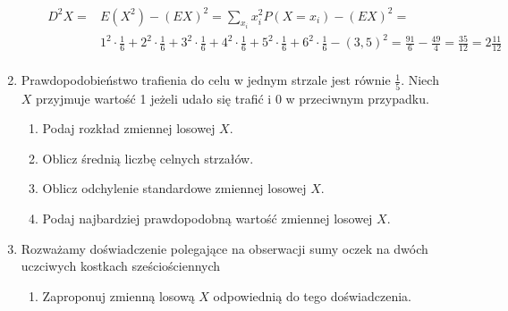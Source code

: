 \documentclass[twoside]{mwart}
\newcommand{\ans}[1]{}
\newcommand{\ans}[1]{\par\emph{Odpowiedź:} #1}
\begin{document}
\begin{enumerate}
\begin{enumerate}
{\begin{enumerate}
\begin{align*}
			D^2X = & E(X^2)-(EX)^2 = \sum_{x_i} x_i^2P(X=x_i) - (EX)^2 = \\
			& 1^2\cdot\frac{1}{6} + 2^2\cdot\frac{1}{6} + 3^2\cdot\frac{1}{6} + 4^2\cdot\frac{1}{6} + 5^2\cdot\frac{1}{6} + 6^2\cdot\frac{1}{6} - (3,5)^2 = \frac{91}{6} - \frac{49}{4} = \frac{35}{12} = 2\frac{11}{12} \\
		\end{align*}
	\end{enumerate}
}
\end{enumerate}
\item Prawdopodobieństwo trafienia do celu w jednym strzale jest równie $\frac{1}{5}$. Niech $X$ przyjmuje wartość 1 jeżeli udało się trafić i 0 w przeciwnym przypadku.
\begin{enumerate}
\item Podaj rozkład zmiennej losowej $X$. \ans{$P(X=1)=p\quad P(X=0)=1-p \qquad p=\frac{1}{5}$}
\item Oblicz średnią liczbę celnych strzałów. \ans{$EX=1\cdot p+0\cdot (1-p)=p=\frac{1}{5}$}
\item Oblicz odchylenie standardowe zmiennej losowej $X$. \ans{$DX= \sqrt{D^2X} = \sqrt{E(X^2)-(EX)^2} = \sqrt{1^2\cdot p - p^2} = \sqrt{p(1-p)}=\sqrt{\frac{4}{25}} = \frac{2}{5}$}
\item Podaj najbardziej prawdopodobną wartość zmiennej losowej $X$. \ans{$0$, bo $P(X=0)>P(X=1)$, a mamy do wyboru tylko $0$ i $1$}
\end{enumerate}
\item Rozważamy doświadczenie polegające na obserwacji sumy oczek na dwóch uczciwych kostkach sześciościennych
\begin{enumerate}
\item Zaproponuj zmienną losową $X$ odpowiednią do tego doświadczenia. 
\ans{
	Niech pojedyncze zdarzenie elementarne to para uporządkowana: (wynik na 1. kostce, wynik na 2. kostce), gdzie wyniki są kodowane przez wyrzuconą liczbę oczek 1, 2, \ldots, 6. Wtedy przestrzeń zdarzeń elementarnych wygląda następująco:
	\[ \Omega = \{1, 2, \ldots, 6\}\times \{1, 2, \ldots, 6\} = \{ (1,1), (1,2), \ldots, (1,6), (2, 1), (2, 2), \ldots, (6, 6)\} \]
	
	Wtedy łatwo zdefiniować zmienną:
	\[ X((i, j)) = i+j \qquad \forall (i,j)\in \Omega \]
	
}
\end{enumerate}
\end{enumerate}
\end{document}
